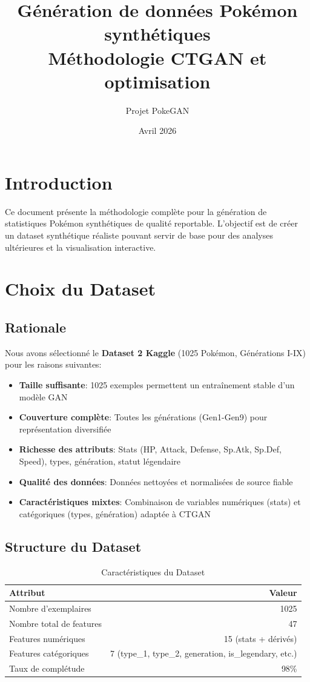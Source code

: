\documentclass[11pt,a4paper]{article}
\title{Génération de données Pokémon synthétiques\\
\Large Méthodologie CTGAN et optimisation}
\author{Projet PokeGAN}
\date{Avril 2026}
\begin{document}
\maketitle

\section{Introduction}

Ce document présente la méthodologie complète pour la génération de statistiques Pokémon synthétiques de qualité reportable. L'objectif est de créer un dataset synthétique réaliste pouvant servir de base pour des analyses ultérieures et la visualisation interactive.

\section{Choix du Dataset}

\subsection{Rationale}

Nous avons sélectionné le \textbf{Dataset 2 Kaggle} (1025 Pokémon, Générations I-IX) pour les raisons suivantes:

\begin{itemize}
    \item \textbf{Taille suffisante}: 1025 exemples permettent un entraînement stable d'un modèle GAN
    \item \textbf{Couverture complète}: Toutes les générations (Gen1-Gen9) pour représentation diversifiée
    \item \textbf{Richesse des attributs}: Stats (HP, Attack, Defense, Sp.Atk, Sp.Def, Speed), types, génération, statut légendaire
    \item \textbf{Qualité des données}: Données nettoyées et normalisées de source fiable
    \item \textbf{Caractéristiques mixtes}: Combinaison de variables numériques (stats) et catégoriques (types, génération) adaptée à CTGAN
\end{itemize}

\subsection{Structure du Dataset}

\begin{table}[H]
\centering
\caption{Caractéristiques du Dataset}
\begin{tabular}{lr}
\toprule
\textbf{Attribut} & \textbf{Valeur} \\
\midrule
Nombre d'exemplaires & 1025 \\
Nombre total de features & 47 \\
Features numériques & 15 (stats + dérivés) \\
Features catégoriques & 7 (type\_1, type\_2, generation, is\_legendary, etc.) \\
Taux de complétude & 98\% \\
\bottomrule
\end{tabular}
\end{table}
\end{document}
